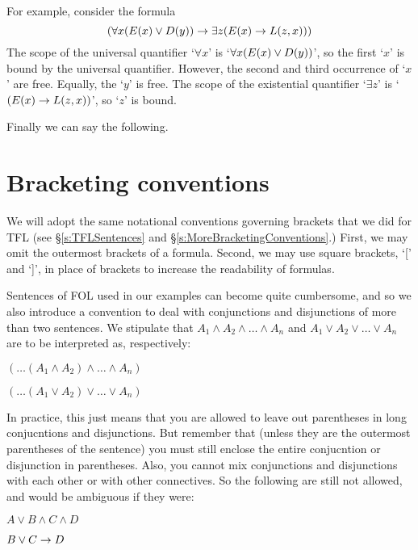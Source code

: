         
For example, consider the formula
	$$(\forall x(\mathord{E}(x) \vee \mathord{D}(y)) \rightarrow \exists z(\mathord{E}(x) \rightarrow \mathord{L}(z,x)))$$
The scope of the universal quantifier `$\forall x$' is `$\forall x (\mathord{E}(x) \vee \mathord{D}(y))$', so the first `$x$' is bound by the universal quantifier. However, the second and third occurrence of `$x$' are free. Equally, the `$y$' is free. The scope of the existential quantifier `$\exists z$' is `$(\mathord{E}(x) \rightarrow \mathord{L}(z,x))$', so `$z$' is bound. 

Finally we can say the following.	


\section{Bracketing conventions}

We will adopt the same notational conventions governing brackets that we did for TFL (see \S\ref{s:TFLSentences} and \S\ref{s:MoreBracketingConventions}.) First, we may omit the outermost brackets of a formula.  Second, we may use square brackets, `[' and `]', in place of brackets to increase the readability of formulas.

Sentences of FOL used in our examples can become quite cumbersome, and so we also introduce a convention to deal with conjunctions and disjunctions of more than two sentences. We stipulate that $A_1 \land A_2 \land \dots \land A_n$ and $A_1 \lor A_2 \lor \dots \lor A_n$ are to be interpreted as, respectively:
\begin{earg}
	\item[] $(\dots(A_1 \land A_2) \land \dots \land A_n)$
	\item[] $(\dots(A_1 \lor A_2) \lor \dots \lor A_n)$
\end{earg}
In practice, this just means that you are allowed to leave out parentheses in long conjucntions and disjunctions. But remember that (unless they are the outermost parentheses of the sentence) you must still enclose the entire conjucntion or disjunction in parentheses. Also, you cannot mix conjunctions and disjunctions with each other or with other connectives. So the following are still not allowed, and would be ambiguous if they were:
\begin{earg}
	\item[] $A \lor B \land C \land D$
	\item[] $B \lor C \rightarrow D$
\end{earg}

